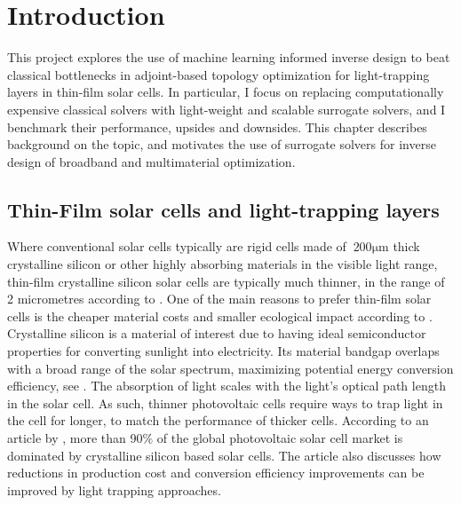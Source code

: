 \chapter{Introduction}
\label{sec:introduction}
This project explores the use of machine learning informed inverse design to beat classical bottlenecks in adjoint-based topology optimization for light-trapping layers in thin-film solar cells.
In particular, I focus on replacing computationally expensive classical solvers with light-weight and scalable surrogate solvers, and I benchmark their performance, upsides and downsides.
This chapter describes background on the topic, and motivates the use of surrogate solvers for inverse design of broadband and multimaterial optimization. 


\section{Thin-Film solar cells and light-trapping layers}
\label{sec:thinfilmintro}
Where conventional solar cells typically are rigid cells made of $~200\mathrm{\mu m}$ thick crystalline silicon or other highly absorbing materials in the visible light range, 
thin-film crystalline silicon solar cells are typically much thinner, in the range of 2 micrometres according to \cite{machin2024advancements}. One of the main reasons to prefer thin-film solar cells 
is the cheaper material costs and smaller ecological impact according to \cite{Pearce2002}.
Crystalline silicon is a material of interest due to having
ideal semiconductor properties for converting sunlight into electricity. Its material bandgap overlaps with a broad range of the solar spectrum, maximizing potential energy conversion efficiency, see \cite{solar_cells_green}. The absorption of light scales with
the light's optical path length in the solar cell. As such, thinner photovoltaic cells require ways to trap light in the cell for longer, to match the performance of thicker cells.
According to an article by \cite{amalathas2019nanostructures}, more than 90\% of the global photovoltaic solar cell market is dominated by crystalline silicon based solar cells.
The article also discusses how reductions in production cost and conversion efficiency improvements can be improved by light trapping approaches.


